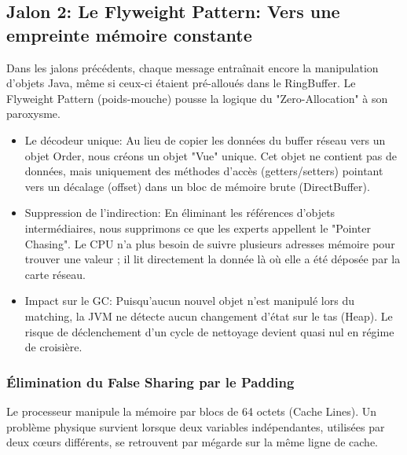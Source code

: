 \subsection{Jalon 2: Le Flyweight Pattern: Vers une empreinte mémoire constante}

Dans les jalons précédents, chaque message entraînait encore la manipulation d'objets Java, même si ceux-ci étaient pré-alloués dans le RingBuffer. Le Flyweight Pattern (poids-mouche) pousse la logique du "Zero-Allocation" à son paroxysme.

\begin{itemize}
    \item Le décodeur unique: Au lieu de copier les données du buffer réseau vers un objet Order, nous créons un objet "Vue" unique. Cet objet ne contient pas de données, mais uniquement des méthodes d'accès (getters/setters) pointant vers un décalage (offset) dans un bloc de mémoire brute (DirectBuffer).
    \item Suppression de l'indirection: En éliminant les références d'objets intermédiaires, nous supprimons ce que les experts appellent le "Pointer Chasing". Le CPU n'a plus besoin de suivre plusieurs adresses mémoire pour trouver une valeur ; il lit directement la donnée là où elle a été déposée par la carte réseau.
    \item Impact sur le GC: Puisqu'aucun nouvel objet n'est manipulé lors du matching, la JVM ne détecte aucun changement d'état sur le tas (Heap). Le risque de déclenchement d'un cycle de nettoyage devient quasi nul en régime de croisière.
\end{itemize}

\subsubsection{Élimination du False Sharing par le Padding}

Le processeur manipule la mémoire par blocs de 64 octets (Cache Lines). Un problème physique survient lorsque deux variables indépendantes, utilisées par deux cœurs différents, se retrouvent par mégarde sur la même ligne de cache.

